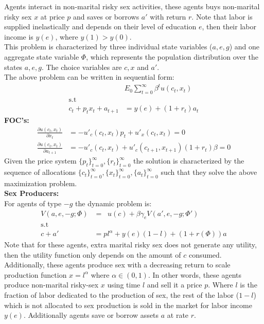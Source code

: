  Agents interact in non-marital risky sex activities, these agents buys non-marital risky sex $x$ at price $p$ and saves or borrows $a'$ with return $r$. Note that labor is supplied inelastically and depends on their level of education $e$, then their labor income is $y(e)$, where $y(1)>y(0)$.\\
 This problem is characterized by three individual state variables ($a,e,g$) and one aggregate state variable $\Phi$, which represents the population distribution over the states $a,e,g$. The choice variables are $c,x$ and $a'$.\\
The above problem can be written in sequential form: 
\begin{align*}
\mathop{\max_{c_{t},x_{t},a_{t+1}}}&E_{0}\sum^{\infty}_{t=0}\beta^{t}u(c_{t},x_{t})  \\
\mbox{s.t}\\ 
c_{t}+p_{t}x_{t}+a_{t+1}&=y(e)+(1+r_{t})a_{t}
\end{align*}
 \textbf{FOC's:}\\
 \begin{align*}
 \frac{\partial u(c_{t},x_{t})}{\partial x_{t}}&=-u'_{c}(c_{t},x_{t})p_{t}+u'_{x}(c_{t},x_{t})=0\\
 \frac{\partial u(c_{t},x_{t})}{\partial a_{t+1}}&=-u'_{c}(c_{t},x_{t})+u'_{c}(c_{t+1},x_{t+1})(1+r_{t})\beta=0
 \end{align*}
 Given the price system $\{p_{t}\}_{t=0}^{\infty},\{r_{t}\}_{t=0}^{\infty}$ the solution is characterized by the sequence of allocations $\{c_{t}\}_{t=0}^{\infty}, \{x_{t}\}_{t=0}^{\infty}, \{a_{t}\}_{t=0}^{\infty}$ such that they solve the above maximization problem.\\
 
\noindent \textbf{Sex Producers:}\\
For agents of type $-g$ the dynamic problem is:
\begin{align}
V(a,e,-g;\Phi) &= \mathop{\max_{c\geq 0, 1\geq l\geq 0,a' \geq 0}}  u(c) + \beta \gamma_{e} V(a',e,-g;\Phi') \label{eq3}\\
\mbox{s.t}\nonumber\\
c +a'&= pl^{\alpha}+y(e)(1-l) + (1+r(\Phi))a \label{eq4}
\end{align}
Note that for these agents, extra marital risky sex does not generate any utility, then the utility function only depends on the amount of $c$ consumed. Additionally, these agents produce sex with a decreasing return to scale production function $x=l^{\alpha}$ where $\alpha\in(0,1)$. In other words, these agents produce non-marital risky-sex $x$ using time $l$ and sell it a price $p$. Where $l$ is the fraction of labor dedicated to the production of sex, the rest of the labor ($1-l$) which is not allocated to sex production is sold in the market for labor income $y(e)$. Additionally agents save or borrow assets $a$ at rate $r$.\\

